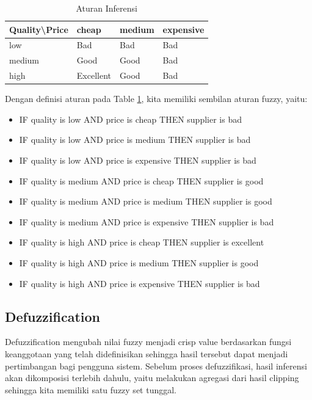 \documentclass[titlepage]{article}
\begin{document}
            \begin{table}[h!]
                \begin{center}
                    \begin{tabular}{@{}llll@{}}
                    \toprule
                    Quality\textbackslash{}Price & cheap     & medium & expensive \\ \midrule
                    low                          & Bad       & Bad    & Bad       \\
                    medium                       & Good      & Good   & Bad       \\
                    high                         & Excellent & Good   & Bad       \\ \bottomrule
                    \end{tabular}
                \end{center}
                \caption{Aturan Inferensi}
                \label{tab:Aturan Inferensi}
            \end{table}

            Dengan definisi aturan pada Table \ref{tab:Aturan Inferensi}, kita memiliki sembilan aturan fuzzy, yaitu:

            \begin{itemize}
                \item IF quality is low AND price is cheap THEN supplier is bad
                \item IF quality is low AND price is medium THEN supplier is bad
                \item IF quality is low AND price is expensive THEN supplier is bad
                \item IF quality is medium AND price is cheap THEN supplier is good
                \item IF quality is medium AND price is medium THEN supplier is good
                \item IF quality is medium AND price is expensive THEN supplier is bad
                \item IF quality is high AND price is cheap THEN supplier is excellent
                \item IF quality is high AND price is medium THEN supplier is good
                \item IF quality is high AND price is expensive THEN supplier is bad
            \end{itemize}

        \subsection{Defuzzification}
            Defuzzification mengubah nilai fuzzy menjadi crisp value berdasarkan fungsi keanggotaan yang telah didefinisikan sehingga hasil tersebut dapat menjadi pertimbangan bagi pengguna sistem. Sebelum proses defuzzifikasi, hasil inferensi akan dikomposisi terlebih dahulu, yaitu melakukan agregasi dari hasil clipping sehingga kita memiliki satu fuzzy set tunggal.
\end{document}
